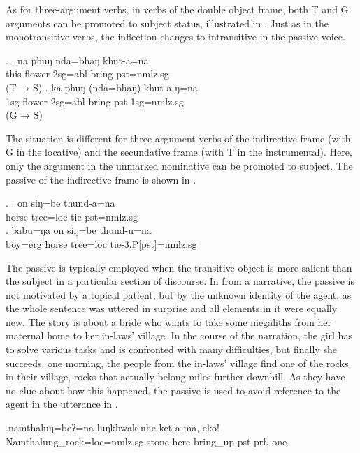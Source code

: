 As for three-argument verbs, in verbs of the double object frame, both T and G arguments can be promoted to subject  status, illustrated in \Next. Just as in the monotransitive verbs, the inflection changes to intransitive in the passive voice. 

\ex. \ag. na phuŋ nda=bhaŋ khut-a=na\\
this  flower {\sc 2sg=abl} bring{\sc [3sg]-pst=nmlz.sg}\\
 (T → S)
\bg. ka phuŋ (nda=bhaŋ) khut-a-ŋ=na\\ 
{\sc 1sg} flower {\sc 2sg=abl} bring{\sc -pst-1sg=nmlz.sg}\\
 (G → S)
 

The situation is different for three-argument verbs of the indirective frame (with G in the locative) and the secundative frame (with T in the instrumental). Here, only the argument in the  unmarked nominative can be promoted to subject. The passive of the indirective frame is shown in \Next.

\ex. \ag. on siŋ=be thund-a=na\\
horse  tree{\sc =loc} tie{\sc [3sg]-pst=nmlz.sg}\\
\bg. babu=ŋa on siŋ=be thund-u=na\\
boy{\sc =erg} horse  tree{\sc =loc}  tie{\sc -3.P[pst]=nmlz.sg}\\


The passive is typically employed when the transitive object is more salient than the subject in a particular section of discourse. In \Next from a narrative, the passive is not motivated by a topical patient, but by the unknown identity of the agent, as the whole sentence was uttered in surprise and all elements in it were equally new. The story is about a bride who wants to take some megaliths from her maternal home to her in-laws' village. In the course of the narration, the girl has to solve various tasks and is confronted with many difficulties, but finally she succeeds: one morning, the people from the in-laws' village find one of the rocks in their village, rocks that actually belong miles further downhill. As they have no clue about how this happened, the passive is used to avoid reference to the agent in the utterance in \Next. 

\exg.namthaluŋ=beʔ=na  luŋkhwak nhe  ket-a-ma, eko!\\
Namthalung\_rock{\sc =loc=nmlz.sg} stone here bring\_up{\sc [3sg]-pst-prf}, one\\


